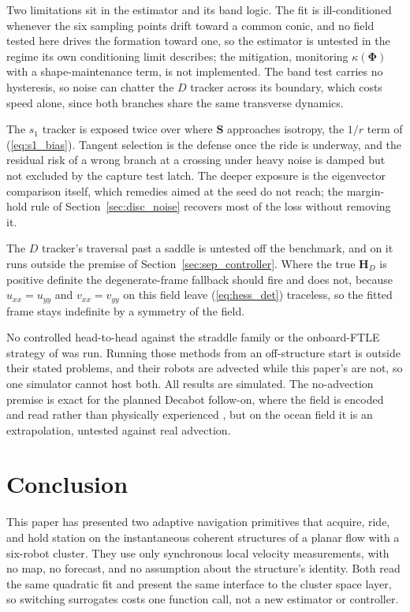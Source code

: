 \documentclass[lettersize,journal]{IEEEtran}
\begin{document}
Two limitations sit in the estimator and its band logic. The fit is
ill-conditioned whenever the six sampling points drift toward a common
conic, and no field tested here drives the formation toward one, so the
estimator is untested in the regime its own conditioning limit
describes; the mitigation, monitoring $\kappa(\boldsymbol{\Phi})$ with a
shape-maintenance term, is not implemented. The band test carries no
hysteresis, so noise can chatter the $D$ tracker across its boundary,
which costs speed alone, since both branches share the same transverse
dynamics.

The $s_1$ tracker is exposed twice over where $\mathbf{S}$ approaches
isotropy, the $1/r$ term of (\ref{eq:s1_bias}). Tangent selection is the
defense once the ride is underway, and the residual risk of a wrong
branch at a crossing under heavy noise is damped but not excluded by the
capture test latch. The deeper exposure is the eigenvector comparison
itself, which remedies aimed at the seed do not reach; the margin-hold
rule of Section~\ref{sec:disc_noise} recovers most of the loss without
removing it.

The $D$ tracker's traversal past a saddle is untested off the benchmark,
and on it runs outside the premise of
Section~\ref{sec:sep_controller}. Where the true $\mathbf{H}_D$ is
positive definite the degenerate-frame fallback should fire and does
not, because $u_{xx} = u_{yy}$ and $v_{xx} = v_{yy}$ on this field
leave (\ref{eq:hess_det}) traceless, so the fitted frame stays
indefinite by a symmetry of the field.

No controlled head-to-head against the straddle family \cite{26,27,28} or the onboard-FTLE strategy of \cite{30} was run. Running those methods from an off-structure start is outside their stated problems, and their robots are advected while this paper's are not, so one simulator cannot host both.
All results are simulated. The no-advection premise is exact for the
planned Decabot follow-on, where the field is encoded and read rather
than physically experienced \cite{34}, but on the ocean field it is an
extrapolation, untested against real advection.

\section{Conclusion}

This paper has presented two adaptive navigation primitives that acquire, ride, and hold station on the instantaneous coherent structures of a planar flow with a six-robot cluster. They use only synchronous local velocity measurements, with no map, no forecast, and no assumption about the structure's identity. Both read the same
quadratic fit and present the same interface to the cluster space layer,
so switching surrogates costs one function call, not a new estimator or
controller.
\end{document}
